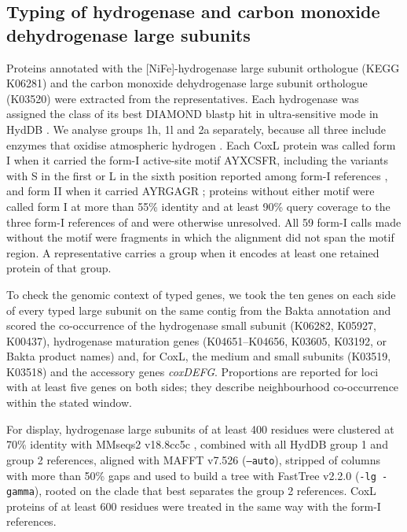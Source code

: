 \subsection*{Typing of hydrogenase and carbon monoxide dehydrogenase large subunits}
Proteins annotated with the [NiFe]-hydrogenase large subunit orthologue (KEGG K06281) and the carbon
monoxide dehydrogenase large subunit orthologue (K03520) were extracted from the representatives. Each
hydrogenase was assigned the class of its best DIAMOND blastp hit in ultra-sensitive mode in HydDB
\citep{sondergaard2016hyddb,greening2016genomic}. We analyse groups 1h, 1l and 2a separately, because all
three include enzymes that oxidise atmospheric hydrogen \citep{greening2016genomic,islam2020group2a}. Each
CoxL protein was called form I when it carried the form-I active-site motif AYXCSFR, including the
variants with S in the first or L in the sixth position reported among form-I references
\citep{imaura2026coxl}, and form II when it carried AYRGAGR
\citep{king2007coox,martincuadrado2009coxl,cunliffe2011roseobacter}; proteins without either motif were
called form I at more than 55\% identity and at least 90\% query coverage to the three form-I references of
\citet{cordero2019atmospheric} and were otherwise unresolved. All 59 form-I calls made without the motif were
fragments in which the alignment did not span the motif region. A representative carries a group when it
encodes at least one retained protein of that group.

To check the genomic context of typed genes, we took the ten genes on each side of every typed large
subunit on the same contig from the Bakta annotation and scored the co-occurrence of the hydrogenase
small subunit (K06282, K05927, K00437), hydrogenase maturation genes (K04651--K04656, K03605, K03192, or
Bakta product names) and, for CoxL, the medium and small subunits (K03519, K03518) and the accessory genes
\textit{coxDEFG}. Proportions are reported for loci with at least five genes on both sides; they describe
neighbourhood co-occurrence within the stated window.

For display, hydrogenase large subunits of at least 400 residues were clustered at 70\% identity with
MMseqs2 v18.8cc5c \citep{steinegger2017mmseqs2}, combined with all HydDB group 1 and group 2 references,
aligned with MAFFT v7.526 \citep{katoh2013mafft} (\texttt{--auto}), stripped of columns with more than 50\%
gaps and used to build a tree with FastTree v2.2.0 \citep{price2010fasttree} (\texttt{-lg -gamma}), rooted
on the clade that best separates the group 2 references. CoxL proteins of at least 600 residues were
treated in the same way with the form-I references.

